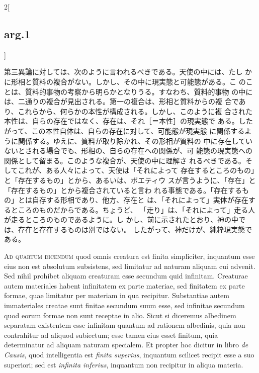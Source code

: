 \documentclass[paper=a4paper,fontsize=10pt,jafontsize=9pt,titlepage]{jlreq}
\begin{document}
\begin{paracol}{2}[\subsection{arg.1}]
\switchcolumn

第三異論に対しては、次のように言われるべきである。天使の中には、たし
 かに形相と質料の複合がない。しかし、その中に現実態と可能態がある。こ
 のことは、質料的事物の考察から明らかとなりうる。すなわち、質料的事物
 の中には、二通りの複合が見出される。第一の複合は、形相と質料からの複
 合であり、これらから、何らかの本性が構成される。しかし、このように複
 合された本性は、自らの存在ではなく、存在は、それ［＝本性］の現実態で
 ある。したがって、この本性自体は、自らの存在に対して、可能態が現実態
 に関係するように関係する。ゆえに、質料が取り除かれ、その形相が質料の
 中に存在していないとされる場合でも、形相の、自らの存在への関係が、可
 能態の現実態への関係として留まる。このような複合が、天使の中に理解さ
 れるべきである。そしてこれが、ある人々によって、天使は「それによって
 存在するところのもの」と「存在するもの」とから、あるいは、ボエティウ
 スが言うように、「存在」と「存在するもの」とから複合されていると言わ
 れる事態である。「存在するもの」とは自存する形相であり、他方、存在と
 は、「それによって」実体が存在するところのものだからである。ちょうど、
 「走り」は、「それによって」走る人が走るところのものであるように。し
 かし、前に示されたとおり、神の中では、存在と存在するものは別ではない。
 したがって、神だけが、純粋現実態である。

\switchcolumn*[\subsection{ad.4}]

{\scshape Ad quartum dicendum} quod omnis creatura est finita
 simpliciter, inquantum esse eius non est absolutum subsistens, sed
 limitatur ad naturam aliquam cui advenit. Sed nihil prohibet aliquam
 creaturam esse secundum quid infinitam. Creaturae autem materiales
 habent infinitatem ex parte materiae, sed finitatem ex parte formae,
 quae limitatur per materiam in qua recipitur. Substantiae autem
 immateriales creatae sunt finitae secundum suum esse, sed infinitae
 secundum quod eorum formae non sunt receptae in alio. Sicut si
 diceremus albedinem separatam existentem esse infinitam quantum ad
 rationem albedinis, quia non contrahitur ad aliquod subiectum; esse
 tamen eius esset finitum, quia determinatur ad aliquam naturam
 specialem. Et propter hoc dicitur in libro {\itshape de Causis}, quod
 intelligentia est {\itshape finita superius}, inquantum scilicet
 recipit esse a suo superiori; sed est {\itshape infinita inferius},
 inquantum non recipitur in aliqua materia.

\switchcolumn


\end{paracol}
\end{document}
